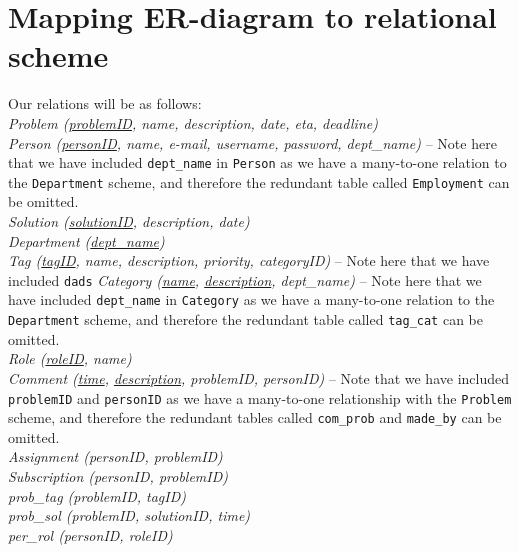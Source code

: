 \section{Mapping ER-diagram to relational scheme}
\label{sec:map_er_rel}

Our relations will be as follows:\\

\noindent \textit{Problem (\underline{problemID}, name, description, date, eta, deadline)} \\
\textit{Person (\underline{personID}, name, e-mail, username, password, dept\_name)}  -- Note here that we have included \verb+dept_name+ in \verb+Person+ as we have a many-to-one relation to the \verb+Department+ scheme, and therefore the redundant table called \verb+Employment+ can be omitted.\\
\textit{Solution (\underline{solutionID}, description, date)} \\
\textit{Department (\underline{dept\_name})} \\
\textit{Tag (\underline{tagID}, name, description, priority, categoryID)} -- Note here that we have included \verb+dads+
\textit{Category (\underline{name}, \underline{description}, dept\_name)} -- Note here that we have included \verb+dept_name+ in \verb+Category+ as we have a many-to-one relation to the \verb+Department+ scheme, and therefore the redundant table called \verb+tag_cat+ can be omitted.\\
\textit{Role (\underline{roleID}, name)} \\
\textit{Comment (\underline{time}, \underline{description}, problemID, personID)} -- Note that we have included \verb+problemID+ and \verb+personID+ as we have a many-to-one relationship with the \verb+Problem+ scheme, and therefore the redundant tables called \verb+com_prob+ and \verb+made_by+ can be omitted.\\
\textit{Assignment (personID, problemID)} \\
\textit{Subscription (personID, problemID)} \\
\textit{prob\_tag (problemID, tagID)} \\
\textit{prob\_sol (problemID, solutionID, time)} \\
\textit{per\_rol (personID, roleID)} \\